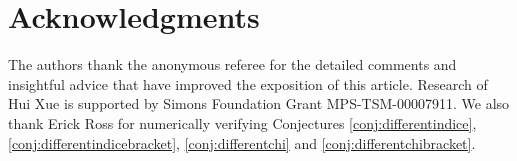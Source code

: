 \documentclass[11pt,letterpaper,reqno]{amsart}
\numberwithin{figure}{section}
\numberwithin{table}{section}
\theoremstyle{definition}
\theoremstyle{plain}
\theoremstyle{definition}
\theoremstyle{definition}
\theoremstyle{remark}
\numberwithin{equation}{section}
\theoremstyle{remark}
\begin{document}
\section*{Acknowledgments}
The authors thank the anonymous referee for the detailed comments and insightful advice that have improved the exposition of this article. Research of Hui Xue is supported by  Simons Foundation Grant MPS-TSM-00007911. We also thank Erick Ross for numerically verifying Conjectures \ref{conj:differentindice}, \ref{conj:differentindicebracket}, \ref{conj:differentchi} and \ref{conj:differentchibracket}. 

  
  \vspace{.2in}

%
%



\providecommand{\bysame}{\leavevmode\hbox
to3em{\hrulefill}\thinspace}



\end{document}
